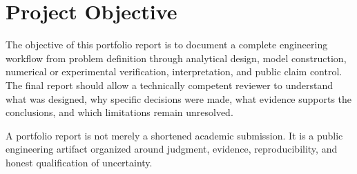 \chapter*{Project Objective}

The objective of this portfolio report is to document a complete engineering workflow
from problem definition through analytical design, model construction, numerical or
experimental verification, interpretation, and public claim control. The final report
should allow a technically competent reviewer to understand what was designed, why
specific decisions were made, what evidence supports the conclusions, and which
limitations remain unresolved.

\begin{engineeringdecision}
A portfolio report is not merely a shortened academic submission. It is a public
engineering artifact organized around judgment, evidence, reproducibility, and honest
qualification of uncertainty.
\end{engineeringdecision}
